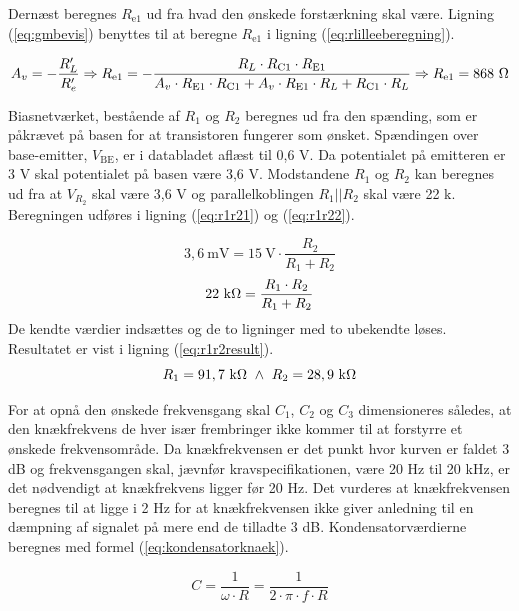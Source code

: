 Dernæst beregnes $R_{\mathrm{e1}}$ ud fra hvad den ønskede forstærkning skal være. Ligning (\ref{eq:gmbevis}) benyttes til at beregne $R_{\mathrm{e1}}$ i ligning (\ref{eq:rlilleeberegning}).

\begin{equation}
\label{eq:rlilleeberegning}
A_v = -\frac{R'_L}{R'_e} \Rightarrow  R_{\mathrm{e1}} =-\frac{R_L \cdot R_{\mathrm{C1}} \cdot R_{\mathrm{E1}}}{A_v \cdot R_{\mathrm{E1}} \cdot R_{\mathrm{C1}} + A_v \cdot R_{\mathrm{E1}} \cdot R_L + R_{\mathrm{C1}} \cdot R_L} \Rightarrow R_{\mathrm{e1}} = 868~\ohm
\end{equation}

Biasnetværket, bestående af $R_1$ og $R_2$ beregnes ud fra den spænding, som er påkrævet på basen for at transistoren fungerer som ønsket. Spændingen over base-emitter, $V_{\mathrm{BE}}$, er i databladet aflæst til 0,6 V. Da potentialet på emitteren er 3 V skal potentialet på basen være 3,6 V. Modstandene $R_1$ og $R_2$ kan beregnes ud fra at $V_{R_2}$ skal være 3,6 V og parallelkoblingen $R_1||R_2$ skal være 22 k\ohm. Beregningen udføres i ligning (\ref{eq:r1r21}) og (\ref{eq:r1r22}).

\begin{equation}
\mathrm{3,6~mV} = \mathrm{15~V} \cdot \frac{R_2}{R_1+R_2} 
\label{eq:r1r21}
\end{equation}
\begin{equation}
22~\mathrm{k\ohm} = \frac{R_1 \cdot R_2}{R_1 + R_2}
\label{eq:r1r22}
\end{equation}
De kendte værdier indsættes og de to ligninger med to ubekendte løses. Resultatet er vist i ligning (\ref{eq:r1r2result}).
\begin{equation}
R_1 = 91,7~\mathrm{k}\ohm ~ \wedge ~ R_2=28,9~\mathrm{k}\ohm
\label{eq:r1r2result}
\end{equation}

For at opnå den ønskede frekvensgang skal $C_1$, $C_2$ og $C_3$ dimensioneres således, at den knækfrekvens de hver især frembringer ikke kommer til at forstyrre et ønskede frekvensområde. Da knækfrekvensen er det punkt hvor kurven er faldet 3 dB og frekvensgangen skal, jævnfør kravspecifikationen, være 20 Hz til 20 kHz, er det nødvendigt at knækfrekvens  ligger før 20 Hz. Det vurderes at knækfrekvensen beregnes til at ligge i 2 Hz for at knækfrekvensen ikke giver anledning til en dæmpning af signalet på mere end de tilladte 3 dB. Kondensatorværdierne beregnes med formel (\ref{eq:kondensatorknaek}).

\begin{equation}
C=\frac{1}{\omega \cdot R}=\frac{1}{2\cdot \pi \cdot f \cdot R}
\label{eq:kondensatorknaek}
\end{equation}

